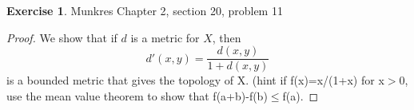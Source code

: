 \documentclass[12pt]{article}
\theoremstyle{definition}
\newtheorem{exercise}{Exercise}
\begin{document}
\begin{exercise} Munkres Chapter 2, section 20, problem 11
\begin{proof}
	We show that if $d$ is a metric for $X$, then \[d'(x,y)=\frac{d(x,y)}{1+d(x,y)}\] is a bounded metric that gives the topology of X. (hint if f(x)=x/(1+x) for x$>$0, use the mean value theorem to show that f(a+b)-f(b)$\leq$f(a). 
\end{proof}
\end{exercise}
\end{document}
